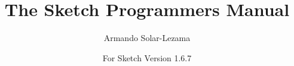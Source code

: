 \documentclass{article}
\newcommand{\version}{1.6.7}
\begin{document}

\title{The Sketch Programmers Manual}
\author{Armando Solar-Lezama}
\date{For Sketch Version \version{}}
\maketitle

\tableofcontents

\newpage






\let\glossarysection=\section
\renewcommand{\glossarypreamble}{\label{glossary}This is a glossary of flags}
\printglossary[title=Glossary of Flags]
\end{document}
